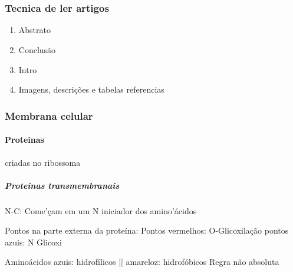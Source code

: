 
\part{}

\section{Tecnica de ler artigos}
\begin{enumerate}
    \item Abstrato
    \item Conclusão
    \item Intro
    \item Imagens, descrições e tabelas referencias
\end{enumerate}

\section{Membrana celular}

\subsection{Proteinas}

criadas no ribossoma

\subsubsection{Proteinas transmembranais}
N-C: Come'çam em um N iniciador dos amino'ácidos

Pontos na parte externa da proteína:
Pontos vermelhos: O-Glicoxilação
pontos azuis:     N Glicoxi

Aminoácidos azuis: hidrofílicos
||          amareloz: hidrofóbicos
Regra não absoluta